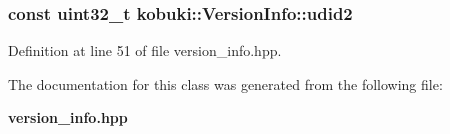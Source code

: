\subsubsection[{udid2}]{\setlength{\rightskip}{0pt plus 5cm}const uint32\-\_\-t {\bf kobuki\-::\-Version\-Info\-::udid2}}\label{classkobuki_1_1VersionInfo_a555c1f0acba7ce4c21d20022d2b214b5}


\-Definition at line 51 of file version\-\_\-info.\-hpp.



\-The documentation for this class was generated from the following file\-:\begin{DoxyCompactItemize}
\item 
{\bf version\-\_\-info.\-hpp}\end{DoxyCompactItemize}
